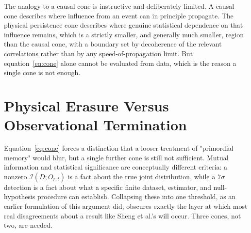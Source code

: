 \documentclass[11pt]{article}
\begin{document}
The analogy to a causal cone is instructive and deliberately limited. A causal cone describes where influence from an event can in principle propagate. The physical persistence cone describes where genuine statistical dependence on that influence remains, which is a strictly smaller, and generally much smaller, region than the causal cone, with a boundary set by decoherence of the relevant correlations rather than by any speed-of-propagation limit. But equation~\eqref{eq:cone} alone cannot be evaluated from data, which is the reason a single cone is not enough.

\section{Physical Erasure Versus Observational Termination}

Equation~\eqref{eq:cone} forces a distinction that a looser treatment of "primordial memory" would blur, but a single further cone is still not sufficient. Mutual information and statistical significance are conceptually different criteria: a nonzero $\mathcal I(D; O_{r,t})$ is a fact about the true joint distribution, while a $7\sigma$ detection is a fact about what a specific finite dataset, estimator, and null-hypothesis procedure can establish. Collapsing these into one threshold, as an earlier formulation of this argument did, obscures exactly the layer at which most real disagreements about a result like Sheng et al.'s will occur. Three cones, not two, are needed.
\end{document}
